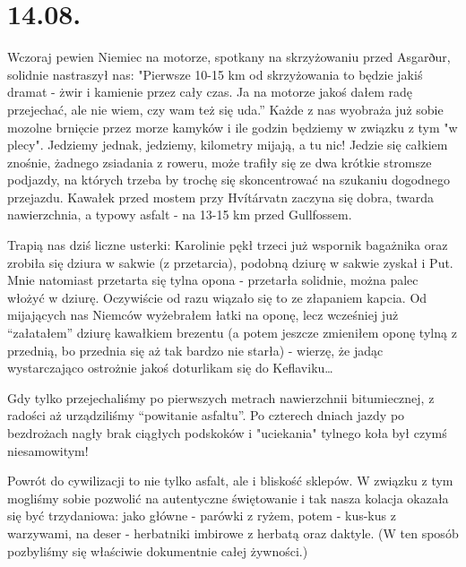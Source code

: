 \chapter{14.08.}

Wczoraj pewien Niemiec na motorze, spotkany na skrzyżowaniu przed Asgarður, solidnie nastraszył nas: "Pierwsze 10-15 km od skrzyżowania to będzie jakiś dramat - żwir i kamienie przez cały czas. Ja na motorze jakoś dałem radę przejechać, ale nie wiem, czy wam też się uda.” Każde z nas wyobraża już sobie mozolne brnięcie przez morze kamyków i ile godzin będziemy w związku z tym "w plecy". Jedziemy jednak, jedziemy, kilometry mijają, a tu nic! Jedzie się całkiem znośnie, żadnego zsiadania z roweru, może trafiły się ze dwa krótkie stromsze podjazdy, na których trzeba by trochę się skoncentrować na szukaniu dogodnego przejazdu. Kawałek przed mostem przy Hvítárvatn zaczyna się dobra, twarda nawierzchnia, a typowy asfalt - na 13-15 km przed Gullfossem.


Trapią nas dziś liczne usterki: Karolinie pękł trzeci już wspornik bagażnika oraz zrobiła się dziura w sakwie (z przetarcia), podobną dziurę w sakwie zyskał i Put. Mnie natomiast przetarta się tylna opona - przetarła solidnie, można palec włożyć w dziurę. Oczywiście od razu wiązało się to ze złapaniem kapcia. Od mijających nas Niemców wyżebrałem łatki na oponę, lecz wcześniej już “załatałem” dziurę kawałkiem brezentu (a potem jeszcze zmieniłem oponę tylną z przednią, bo przednia się aż tak bardzo nie starła) - wierzę, że jadąc wystarczająco ostrożnie jakoś doturlikam się do Keflaviku…


Gdy tylko przejechaliśmy po pierwszych metrach nawierzchnii bitumiecznej, z radości aż urządziliśmy “powitanie asfaltu”. Po czterech dniach jazdy po bezdrożach nagły brak ciągłych podskoków i "uciekania" tylnego koła był czymś niesamowitym!

Powrót do cywilizacji to nie tylko asfalt, ale i bliskość sklepów. W związku z tym mogliśmy sobie pozwolić na autentyczne świętowanie i tak nasza kolacja okazała się być trzydaniowa: jako główne - parówki z ryżem, potem - kus-kus z warzywami, na deser - herbatniki imbirowe z herbatą oraz daktyle. (W ten sposób pozbyliśmy się właściwie dokumentnie całej żywności.)

